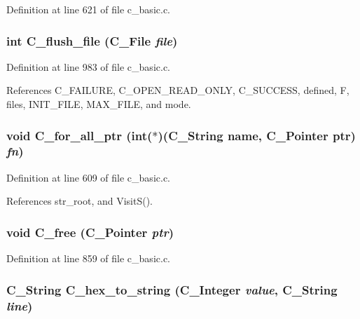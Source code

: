 Definition at line 621 of file c\_\-basic.c.
\subsubsection{\setlength{\rightskip}{0pt plus 5cm}int C\_\-flush\_\-file (\bf{C\_\-File} {\em file})}\label{c__basic_8c_01d7ce07875dd7a35486434c641b0b9d}




Definition at line 983 of file c\_\-basic.c.

References C\_\-FAILURE, C\_\-OPEN\_\-READ\_\-ONLY, C\_\-SUCCESS, defined, F, files, INIT\_\-FILE, MAX\_\-FILE, and mode.
\subsubsection{\setlength{\rightskip}{0pt plus 5cm}void C\_\-for\_\-all\_\-ptr (int($\ast$)(\bf{C\_\-String} \bf{name}, \bf{C\_\-Pointer} ptr) {\em fn})}\label{c__basic_8c_4164cf8a2b1dc649057072e0aa3095a2}




Definition at line 609 of file c\_\-basic.c.

References str\_\-root, and Visit\-S().
\subsubsection{\setlength{\rightskip}{0pt plus 5cm}void C\_\-free (\bf{C\_\-Pointer} {\em ptr})}\label{c__basic_8c_c4f36c66a129f1ab02a3a5bd73d34321}




Definition at line 859 of file c\_\-basic.c.
\subsubsection{\setlength{\rightskip}{0pt plus 5cm}\bf{C\_\-String} C\_\-hex\_\-to\_\-string (\bf{C\_\-Integer} {\em value}, \bf{C\_\-String} {\em line})}\label{c__basic_8c_1362ed3d1dd6504198ea23205cfc85f7}




